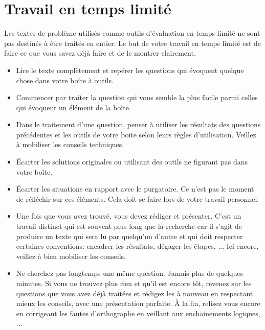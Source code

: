 \section{Travail en temps limité}
Les textes de problème utilisés comme outils d'évaluation en temps limité ne sont pas destinés à être traités en entier.\newline
Le but de votre travail en temps limité est de faire ce que vous savez déjà faire et de le montrer clairement.
\begin{itemize}
 \item Lire le texte complètement et repérer les questions qui évoquent quelque chose dans votre boîte à outils.
 \item Commencer par traiter la question qui vous semble la plus facile parmi celles qui évoquent un élément de la boîte. 
 \item Dans le traitement d'une question, penser à utiliser les résultats des questions précédentes et les outils de votre boite selon leurs règles d'utilisation. Veillez à mobiliser les conseils techniques.
 \item \'Ecarter les solutions originales ou utilisant des outils ne figurant pas dans votre boîte.
 \item \'Ecarter les situations en rapport avec le purgatoire. Ce n'est pas le moment de réfléchir sur ces éléments. Cela doit se faire lors de votre travail personnel.
 \item Une fois que vous avez trouvé, vous devez rédiger et présenter. C'est un travail distinct qui est souvent plus long que la recherche car il s'agit de produire un texte qui sera lu par quelqu'un d'autre et qui doit respecter certaines conventions: encadrer les résultats, dégager les étapes, ... Ici encore, veillez à bien mobiliser les conseils.
 \item Ne cherchez pas longtemps une même question. Jamais plus de quelques minutes. Si vous ne trouvez plus rien et qu'il est encore tôt, revenez sur les questions que vous avez déjà traitées et rédigez les à nouveau en respectant mieux les conseils, avec une présentation parfaite. \`A la fin, relisez vous encore en corrigeant les fautes d'orthographe en veillant aux enchainements logiques, ...  
\end{itemize} 




